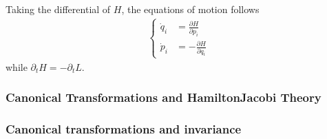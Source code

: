 \documentclass[letterpaper,10pt,english]{jupyterBook}
\begin{document}
\sphinxAtStartPar
Taking the differential of \(H\), the equations of motion follows
\begin{equation*}
\begin{split}\left\{ 
\begin{aligned}
  \dot{q}_i & =  \frac{\partial H}{\partial p_i} \\
  \dot{p}_i & = -\frac{\partial H}{\partial q_i}
\end{aligned} \right.\end{split}
\end{equation*}
\sphinxAtStartPar
while \(\partial_t H = - \partial_t L\).


\subsubsection{Canonical Transformations and Hamilton\sphinxhyphen{}Jacobi Theory}
\label{\detokenize{ch/quantum-mechanics/atom-models/analytical-mechanics-short:canonical-transformations-and-hamilton-jacobi-theory}}\label{\detokenize{ch/quantum-mechanics/atom-models/analytical-mechanics-short:analytical-mechanics-short-canonical-transformations}}\subsubsection*{Canonical transformations and invariance}
\end{document}
